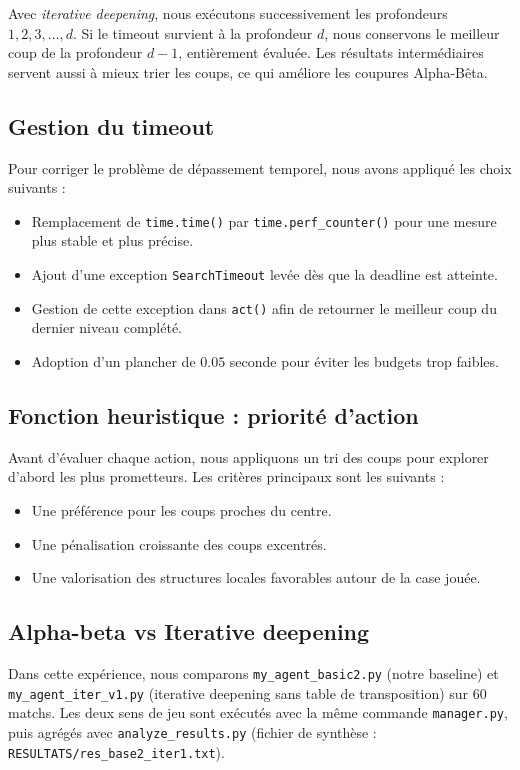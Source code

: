 Avec \textit{iterative deepening}, nous exécutons successivement les profondeurs $1,2,3,\dots,d$. Si le timeout survient à la profondeur $d$, nous conservons le meilleur coup de la profondeur $d-1$, entièrement évaluée. Les résultats intermédiaires servent aussi à mieux trier les coups, ce qui améliore les coupures Alpha-Bêta.

\subsection{Gestion du timeout}

Pour corriger le problème de dépassement temporel, nous avons appliqué les choix suivants :\\

\begin{itemize}
    \item Remplacement de \texttt{time.time()} par \texttt{time.perf\_counter()} pour une mesure plus stable et plus précise.
    \item Ajout d'une exception \texttt{SearchTimeout} levée dès que la deadline est atteinte.
    \item Gestion de cette exception dans \texttt{act()} afin de retourner le meilleur coup du dernier niveau complété.
    \item Adoption d'un plancher de $0.05$ seconde pour éviter les budgets trop faibles.
\end{itemize}

\subsection{Fonction heuristique : priorité d'action}
Avant d'évaluer chaque action, nous appliquons un tri des coups pour explorer d'abord les plus prometteurs. Les critères principaux sont les suivants :\\

\begin{itemize}
    \item Une préférence pour les coups proches du centre.
    \item Une pénalisation croissante des coups excentrés.
    \item Une valorisation des structures locales favorables autour de la case jouée.
\end{itemize}


\subsection{Alpha-beta vs Iterative deepening}
Dans cette expérience, nous comparons \texttt{my\_agent\_basic2.py} (notre baseline) et \texttt{my\_agent\_iter\_v1.py} (iterative deepening sans table de transposition) sur 60 matchs. Les deux sens de jeu sont exécutés avec la même commande \texttt{manager.py}, puis agrégés avec \texttt{analyze\_results.py} (fichier de synthèse : \texttt{RESULTATS/res\_base2\_iter1.txt}).\\

